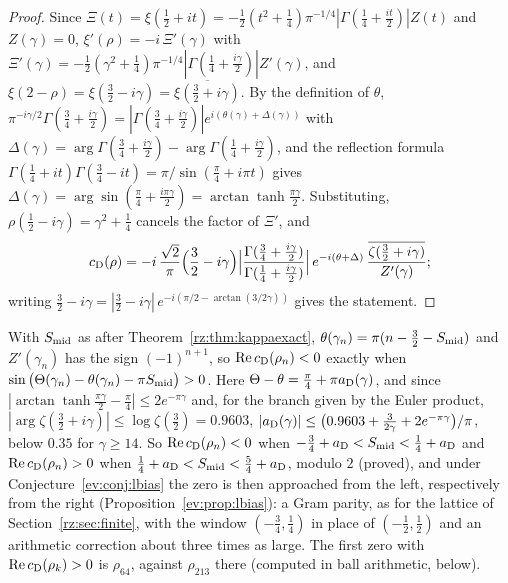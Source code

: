 \begin{proof}
Since $\Xi(t)=\xi(\frac12+it)=-\frac12(t^2+\frac14)\pi^{-1/4}|\Gamma(\frac14+\frac{it}2)|Z(t)$ and $Z(\gamma)=0$, $\xi'(\rho)=-i\,\Xi'(\gamma)$ with $\Xi'(\gamma)=-\frac12(\gamma^2+\frac14)\pi^{-1/4}|\Gamma(\frac14+\frac{i\gamma}2)|Z'(\gamma)$, and $\xi(2-\rho)=\xi(\frac32-i\gamma)=\overline{\xi(\frac32+i\gamma)}$. By the definition of $\theta$, $\pi^{-i\gamma/2}\Gamma(\frac34+\frac{i\gamma}2)=|\Gamma(\frac34+\frac{i\gamma}2)|e^{i(\theta(\gamma)+\Delta(\gamma))}$ with $\Delta(\gamma)=\arg\Gamma(\frac34+\frac{i\gamma}2)-\arg\Gamma(\frac14+\frac{i\gamma}2)$, and the reflection formula $\Gamma(\frac14+it)\Gamma(\frac34-it)=\pi/\sin(\frac\pi4+i\pi t)$ gives $\Delta(\gamma)=\arg\sin(\frac\pi4+\frac{i\pi\gamma}2)=\arctan\tanh\frac{\pi\gamma}2$. Substituting, $\rho(\frac12-i\gamma)=\gamma^2+\frac14$ cancels the factor of $\Xi'$, and
\[
c_{\rm D}(\rho)=-i\,\frac{\sqrt2}\pi\Big(\frac32-i\gamma\Big)\Big|\frac{\Gamma(\frac34+\frac{i\gamma}2)}{\Gamma(\frac14+\frac{i\gamma}2)}\Big|\,e^{-i(\theta+\Delta)}\,\frac{\overline{\zeta(\frac32+i\gamma)}}{Z'(\gamma)} ;
\]
writing $\frac32-i\gamma=|\frac32-i\gamma|\,e^{-i(\pi/2-\arctan(3/2\gamma))}$ gives the statement.
\end{proof}

With $S_{\rm mid}$ as after Theorem~\ref{rz:thm:kappaexact}, $\theta(\gamma_n)=\pi(n-\frac32-S_{\rm mid})$ and $Z'(\gamma_n)$ has the sign $(-1)^{n+1}$, so $\operatorname{Re}c_{\rm D}(\rho_n)<0$ exactly when $\sin\big(\Theta(\gamma_n)-\theta(\gamma_n)-\pi S_{\rm mid}\big)>0$. Here $\Theta-\theta=\frac\pi4+\pi a_{\rm D}(\gamma)$, and since $|\arctan\tanh\frac{\pi\gamma}2-\frac\pi4|\le2e^{-\pi\gamma}$ and, for the branch given by the Euler product, $|\arg\zeta(\frac32+i\gamma)|\le\log\zeta(\frac32)=0.9603$, $|a_{\rm D}(\gamma)|\le\big(0.9603+\frac3{2\gamma}+2e^{-\pi\gamma}\big)/\pi$, below $0.35$ for $\gamma\ge14$. So $\operatorname{Re}c_{\rm D}(\rho_n)<0$ when $-\frac34+a_{\rm D}<S_{\rm mid}<\frac14+a_{\rm D}$ and $\operatorname{Re}c_{\rm D}(\rho_n)>0$ when $\frac14+a_{\rm D}<S_{\rm mid}<\frac54+a_{\rm D}$, modulo $2$ (proved), and under Conjecture~\ref{ev:conj:lbias} the zero is then approached from the left, respectively from the right (Proposition~\ref{ev:prop:lbias}): a Gram parity, as for the lattice of Section~\ref{rz:sec:finite}, with the window $(-\frac34,\frac14)$ in place of $(-\frac12,\frac12)$ and an arithmetic correction about three times as large. The first zero with $\operatorname{Re}c_{\rm D}(\rho_k)>0$ is $\rho_{64}$, against $\rho_{213}$ there (computed in ball arithmetic, below).

